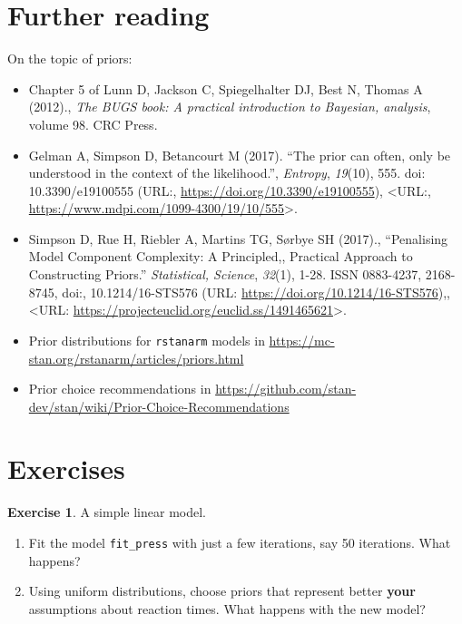 \documentclass[12pt,]{krantz}
\providecommand{\tightlist}{%
  \setlength{\itemsep}{0pt}\setlength{\parskip}{0pt}}
\theoremstyle{definition}
\theoremstyle{definition}
\theoremstyle{definition}
\newtheorem{exercise}{Exercise}[chapter]
\theoremstyle{remark}
\begin{document}
\hypertarget{further-reading-2}{%
\section{Further reading}\label{further-reading-2}}

On the topic of priors:

\begin{itemize}
\tightlist
\item
  Chapter 5 of Lunn D, Jackson C, Spiegelhalter DJ, Best N, Thomas A (2012)., \emph{The BUGS book: A practical introduction to Bayesian, analysis}, volume 98. CRC Press.
\item
  Gelman A, Simpson D, Betancourt M (2017). ``The prior can often, only be understood in the context of the likelihood.'', \emph{Entropy}, \emph{19}(10), 555. doi: 10.3390/e19100555 (URL:, \url{https://doi.org/10.3390/e19100555}), \textless{}URL:, \url{https://www.mdpi.com/1099-4300/19/10/555}\textgreater{}.
\item
  Simpson D, Rue H, Riebler A, Martins TG, Sørbye SH (2017)., ``Penalising Model Component Complexity: A Principled,, Practical Approach to Constructing Priors.'' \emph{Statistical, Science}, \emph{32}(1), 1-28. ISSN 0883-4237, 2168-8745, doi:, 10.1214/16-STS576 (URL: \url{https://doi.org/10.1214/16-STS576}),, \textless{}URL: \url{https://projecteuclid.org/euclid.ss/1491465621}\textgreater{}.
\item
  Prior distributions for \texttt{rstanarm} models in \url{https://mc-stan.org/rstanarm/articles/priors.html}
\item
  Prior choice recommendations in \url{https://github.com/stan-dev/stan/wiki/Prior-Choice-Recommendations}
\end{itemize}

\hypertarget{ex:compbda}{%
\section{Exercises}\label{ex:compbda}}

\begin{exercise}
\protect\hypertarget{exr:linearmod}{}{\label{exr:linearmod} }A simple linear model.
\end{exercise}

\vspace{-.5cm}

\begin{enumerate}
\def\labelenumi{\alph{enumi}.}
\tightlist
\item
  Fit the model \texttt{fit\_press} with just a few iterations, say 50 iterations. What happens?
\item
  Using uniform distributions, choose priors that represent better \textbf{your} assumptions about reaction times. What happens with the new model?
\end{enumerate}
\end{document}
